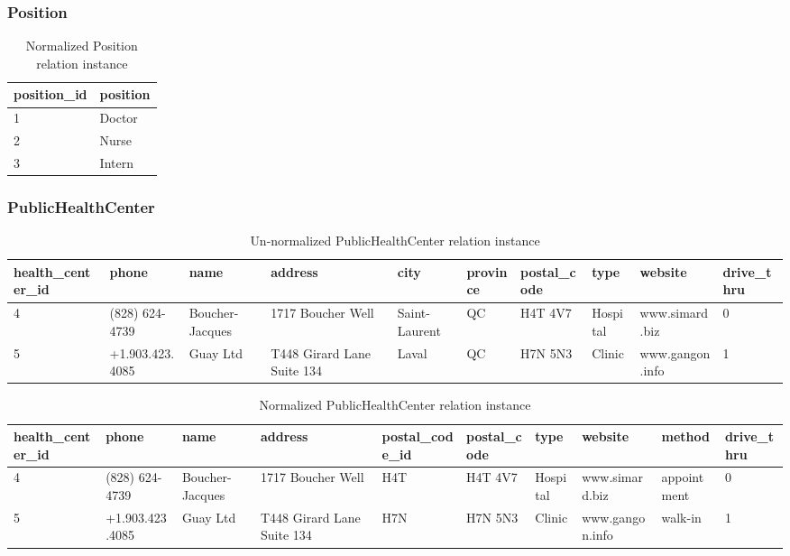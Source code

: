 \subsubsection{Position}
\begin{table}[H]
\centering
\begin{adjustbox}{width=0.2\textwidth,center=\textwidth}
\begin{tabular}{|l|l|} 
        \hline
        position\_id & position \\ 
        \hline
        1 & Doctor \\
        2 & Nurse \\
        3 & Intern \\
        \hline
\end{tabular}
\end{adjustbox}
\caption{Normalized Position relation instance}
\end{table}


\subsubsection{PublicHealthCenter}
\begin{table}[H]
\centering
\begin{adjustbox}{width=1.2\textwidth,center=\textwidth}
\begin{tabular}{|l|l|l|l|l|l|l|l|l|l|} 
        \hline
        health\_center\_id & phone & name & address & city & province & postal\_code & type & website & drive\_thru\\ 
        \hline
        4 & (828) 624-4739 & Boucher-Jacques & 1717 Boucher Well & Saint-Laurent & QC & H4T 4V7 & Hospital & www.simard.biz & 0\\
        5 & +1.903.423.4085 & Guay Ltd & T448 Girard Lane Suite 134 & Laval & QC & H7N 5N3 & Clinic & www.gangon.info & 1\\
        \hline
\end{tabular}
\end{adjustbox}
\caption{Un-normalized PublicHealthCenter relation instance}
\end{table}

\begin{table}[H]
\centering
\begin{adjustbox}{width=1.2\textwidth,center=\textwidth}
\begin{tabular}{|l|l|l|l|l|l|l|l|l|l|} 
        \hline
        health\_center\_id & phone & name & address & postal\_code\_id& postal\_code & type & website & method & drive\_thru\\ 
        \hline
        4 & (828) 624-4739 & Boucher-Jacques & 1717 Boucher Well & H4T & H4T 4V7 & Hospital & www.simard.biz & appointment & 0\\
        5 & +1.903.423.4085 & Guay Ltd & T448 Girard Lane Suite 134 & H7N & H7N 5N3 & Clinic & www.gangon.info & walk-in & 1\\
        \hline
\end{tabular}
\end{adjustbox}
\caption{Normalized PublicHealthCenter relation instance}
\end{table}

